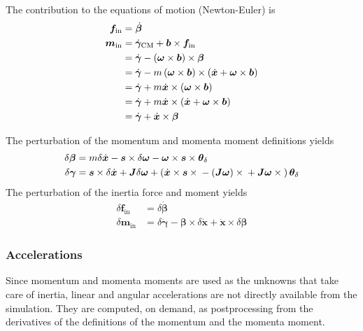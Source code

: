 \documentclass[10pt,fleqn,subeqn]{report}
\newcommand{\T}[1]{\bm{#1}}
\newcommand{\TT}[1]{\bm{#1}}
\begin{document}
The contribution to the equations of motion (Newton-Euler) is
\begin{subequations}
\label{eq:body:newton-euler}
\begin{align}
	\T{f}_{\text{in}} &= \dot{\T{\beta}}
	\label{eq:body:newton-euler:f}
	\\
	\T{m}_{\text{in}} &= \dot{\T{\gamma}}_{\text{CM}} + \T{b}\times\T{f}_{\text{in}} \nonumber \\
	&= \dot{\T{\gamma}} - \plbr{\T{\omega}\times\T{b}}\times\T{\beta} \nonumber \\
	&= \dot{\T{\gamma}} - m \plbr{\T{\omega}\times\T{b}}\times\plbr{\dot{\T{x}} + \T{\omega}\times\T{b}} \nonumber \\
	&= \dot{\T{\gamma}} + m \dot{\T{x}}\times\plbr{\T{\omega}\times\T{b}} \nonumber \\
	&= \dot{\T{\gamma}} + m \dot{\T{x}}\times\plbr{\dot{\T{x}} + \T{\omega}\times\T{b}} \nonumber \\
	&= \dot{\T{\gamma}} + \dot{\T{x}}\times\T{\beta}
	\label{eq:body:newton-euler:m}
\end{align}
\end{subequations}

The perturbation of the momentum and momenta moment definitions yields
\begin{subequations}
\label{eq:nodes:delta-beta-gamma}
\begin{align}
	\delta\T{\beta}
	&= m \delta\dot{\T{x}}
	- \T{s}\times\delta\T{\omega}
	- \T{\omega}\times\T{s}\times\T{\theta}_{\delta} \\
	\delta\T{\gamma}
	&=
	\T{s}\times\delta\dot{\T{x}}
	+ \TT{J} \delta\T{\omega}
	+ \plbr{
		\dot{\T{x}}\times\T{s}\times{}
		- \plbr{\TT{J} \T{\omega}}\times{}
		+ \TT{J} \T{\omega}\times{}
	}\T{\theta}_{\delta}
\end{align}
\end{subequations}
The perturbation of the inertia force and moment yields
\begin{subequations}
\begin{align}
	\delta\T{f}_{\text{in}}
	&= \delta\dot{\T{\beta}} \\
	\delta\T{m}_{\text{in}}
	&= \delta\dot{\T{\gamma}}
	- \T{\beta}\times\delta\dot{\T{x}}
	+ \dot{\T{x}}\times\delta\T{\beta}
\end{align}
\end{subequations}

\subsubsection{Accelerations}
\label{sec:nodes:structural nodes:dynamic structural nodes:accelerations}
Since momentum and momenta moments are used as the unknowns
that take care of inertia, linear and angular accelerations
are not directly available from the simulation.
They are computed, on demand, as postprocessing from the derivatives
of the definitions of the momentum and the momenta moment.
\end{document}
